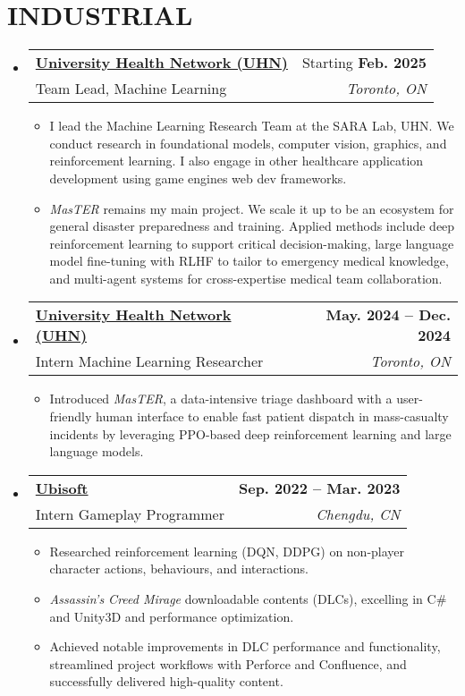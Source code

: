 \documentclass[letterpaper,11pt]{article}
\makeatletter
\newcommand{\resumeItem}[1]{
  \item\small{
    {#1 \vspace{-2pt}}
  }
}
\newcommand{\resumeSubheading}[4]{
  \vspace{-2pt}\item
    \begin{tabular*}{1.0\textwidth}[t]{l@{\extracolsep{\fill}}r}
      \textbf{\small{#1}} & {#2} \\
      {#3} & \textit{\small #4} \\
    \end{tabular*}\vspace{-7pt}
}
\newcommand{\resumeSubHeadingListStart}{\begin{itemize}[leftmargin=0.0in, label={}]}
\newcommand{\resumeSubHeadingListEnd}{\end{itemize}}
\newcommand{\resumeItemListStart}{\begin{itemize}}
\newcommand{\resumeItemListEnd}{\end{itemize}\vspace{-5pt}}
\makeatother
\begin{document}
\section{INDUSTRIAL}
  \resumeSubHeadingListStart
    \resumeSubheading
      {\href{https://temertysimcentre.com/surgical-artificial-intelligence-research-academy-sara/}{University Health Network (UHN)}}{Starting \textbf{Feb. 2025}}
      {Team Lead, Machine Learning}{Toronto, ON}
      \resumeItemListStart
        \resumeItem{I lead the Machine Learning Research Team at the SARA Lab, UHN. We conduct research in foundational models, computer vision, graphics, and reinforcement learning. I also engage in other healthcare application development using game engines web dev frameworks.}
        \resumeItem{\textit{MasTER} remains my main project. We scale it up to be an ecosystem for general disaster preparedness and training. Applied methods include deep reinforcement learning to support critical decision-making, large language model fine-tuning with RLHF to tailor to emergency medical knowledge, and multi-agent systems for cross-expertise medical team collaboration.}
        
      \resumeItemListEnd
    \resumeSubheading
      {\href{https://temertysimcentre.com/surgical-artificial-intelligence-research-academy-sara/}{University Health Network (UHN)}}{\textbf{May. 2024 -- Dec. 2024}}
      {Intern Machine Learning Researcher}{Toronto, ON}
      \resumeItemListStart
        \resumeItem{Introduced \textit{MasTER}, a data-intensive triage dashboard with a user-friendly human interface to enable fast patient dispatch in mass-casualty incidents by leveraging PPO-based deep reinforcement learning and large language models.}
      \resumeItemListEnd
    \resumeSubheading
      {\href{https://www.ubisoft.com/}{Ubisoft}}{\textbf{Sep. 2022 -- Mar. 2023}}
      {Intern Gameplay Programmer}{Chengdu, CN}
      \resumeItemListStart
        \resumeItem{Researched reinforcement learning (DQN, DDPG) on non-player character actions, behaviours, and interactions. }
        \resumeItem{\textit{Assassin's Creed Mirage} downloadable contents (DLCs), excelling in C\# and Unity3D and performance optimization. }
        \resumeItem{Achieved notable improvements in DLC performance and functionality, streamlined project workflows with Perforce and Confluence, and successfully delivered high-quality content. }
      \resumeItemListEnd
  \resumeSubHeadingListEnd

\vspace{-5pt}
\end{document}

